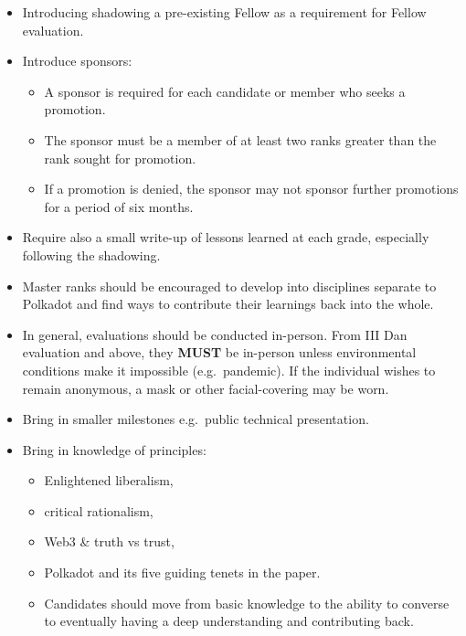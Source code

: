 \documentclass[9pt,oneside]{amsart}
\begin{document}
\begin{itemize}
  \item Introducing shadowing a pre-existing Fellow as a requirement for Fellow evaluation.
  \item Introduce sponsors:
    \begin{itemize}
      \item A sponsor is required for each candidate or member who seeks a promotion.
      \item The sponsor must be a member of at least two ranks greater than the rank sought for promotion.
      \item If a promotion is denied, the sponsor may not sponsor further promotions for a period of six months.
    \end{itemize}
  \item Require also a small write-up of lessons learned at each grade, especially following the shadowing.
  \item Master ranks should be encouraged to develop into disciplines separate to Polkadot and find ways to contribute their learnings back into the whole.
  \item In general, evaluations should be conducted in-person. From III Dan evaluation and above, they \textbf{MUST} be in-person unless environmental conditions make it impossible (e.g.~pandemic). If the individual wishes to remain anonymous, a mask or other facial-covering may be worn.
  \item Bring in smaller milestones e.g.~public technical presentation.
  \item Bring in knowledge of principles:
    \begin{itemize}
    \item Enlightened liberalism,
    \item critical rationalism,
    \item Web3 \& truth vs trust,
    \item Polkadot and its five guiding tenets in the paper.
    \item Candidates should move from basic knowledge to the ability to converse to eventually having a deep understanding and contributing back.
  \end{itemize}
\end{itemize}
\end{document}
